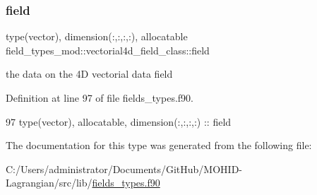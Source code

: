 \subsubsection{\texorpdfstring{field}{field}}
{\footnotesize\ttfamily type(vector), dimension(\+:,\+:,\+:,\+:), allocatable field\+\_\+types\+\_\+mod\+::vectorial4d\+\_\+field\+\_\+class\+::field\hspace{0.3cm}{\ttfamily [private]}}



the data on the 4D vectorial data field 



Definition at line 97 of file fields\+\_\+types.\+f90.


\begin{DoxyCode}
97         \textcolor{keywordtype}{type}(vector), \textcolor{keywordtype}{allocatable}, \textcolor{keywordtype}{dimension(:,:,:,:)} :: field
\end{DoxyCode}


The documentation for this type was generated from the following file\+:\begin{DoxyCompactItemize}
\item 
C\+:/\+Users/administrator/\+Documents/\+Git\+Hub/\+M\+O\+H\+I\+D-\/\+Lagrangian/src/lib/\mbox{\hyperlink{fields__types_8f90}{fields\+\_\+types.\+f90}}\end{DoxyCompactItemize}
